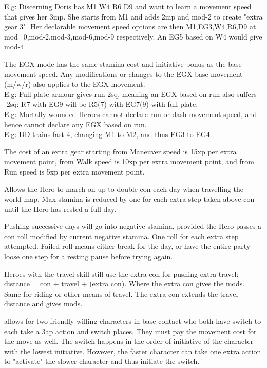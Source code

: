 E.g: Discerning Doris has M1 W4 R6 D9 and want to learn a movement speed that gives her 3mp. She starts from M1 and adds 2mp and mod-2 to create "extra gear 3". Her declarable movement speed options are then M1,EG3,W4,R6,D9 at mod=0,mod-2,mod-3,mod-6,mod-9 respectively. An EG5 based on W4 would give mod-4.

The EGX mode has the same stamina cost and initiative bonus as the base movement speed. Any modifications or changes to the EGX base movement (m/w/r) also applies to the EGX movement. \\
E.g: Full plate armour gives run-2sq, meaning an EGX based on run also suffers -2sq: R7 with EG9 will be R5(7) with EG7(9) with full plate. \\
E.g: Mortally wounded Heroes cannot declare run or dash movement speed, and hence cannot declare any EGX based on run.\\
E.g: DD trains fast 4, changing M1 to M2, and thus EG3 to EG4.

The cost of an extra gear starting from Maneuver speed is 15xp per extra movement point, from Walk speed is 10xp per extra movement point, and from Run speed is 5xp per extra movement point.



Allows the Hero to march on up to double con each day when travelling the world map. Max stamina is reduced by one for each extra step taken above con until the Hero has rested a full day.

Pushing successive days will go into negative stamina, provided the Hero passes a con roll modified by current negative stamina. One roll for each extra step attempted. Failed roll means either break for the day, or have the entire party loose one step for a resting pause before trying again.

Heroes with the travel skill still use the extra con for pushing extra travel:\\
distance = con + travel + (extra con). Where the extra con gives the mods. Same for riding or other means of travel. The extra con extends the travel distance and gives mods.


 allows for two friendly willing characters in base contact who both have switch to each take a 3ap action and switch places. They must pay the movement cost for the move as well. The switch happens in the order of initiative of the character with the lowest initiative. However, the faster character can take one extra action to "activate" the slower character and thus initiate the switch.

